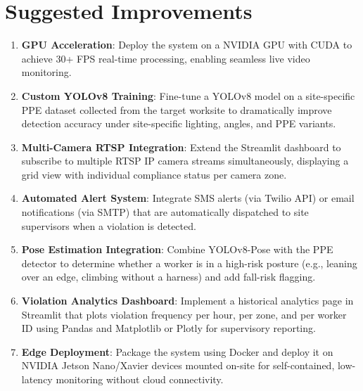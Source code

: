 \documentclass[12pt,a4paper]{report}
\begin{document}
\section{Suggested Improvements}

\begin{enumerate}
    \item \textbf{GPU Acceleration}: Deploy the system on a NVIDIA GPU with CUDA to achieve 30+ FPS real-time processing, enabling seamless live video monitoring.
    
    \item \textbf{Custom YOLOv8 Training}: Fine-tune a YOLOv8 model on a site-specific PPE dataset collected from the target worksite to dramatically improve detection accuracy under site-specific lighting, angles, and PPE variants.
    
    \item \textbf{Multi-Camera RTSP Integration}: Extend the Streamlit dashboard to subscribe to multiple RTSP IP camera streams simultaneously, displaying a grid view with individual compliance status per camera zone.
    
    \item \textbf{Automated Alert System}: Integrate SMS alerts (via Twilio API) or email notifications (via SMTP) that are automatically dispatched to site supervisors when a violation is detected.
    
    \item \textbf{Pose Estimation Integration}: Combine YOLOv8-Pose with the PPE detector to determine whether a worker is in a high-risk posture (e.g., leaning over an edge, climbing without a harness) and add fall-risk flagging.
    
    \item \textbf{Violation Analytics Dashboard}: Implement a historical analytics page in Streamlit that plots violation frequency per hour, per zone, and per worker ID using Pandas and Matplotlib or Plotly for supervisory reporting.
    
    \item \textbf{Edge Deployment}: Package the system using Docker and deploy it on NVIDIA Jetson Nano/Xavier devices mounted on-site for self-contained, low-latency monitoring without cloud connectivity.
\end{enumerate}

\end{document}
